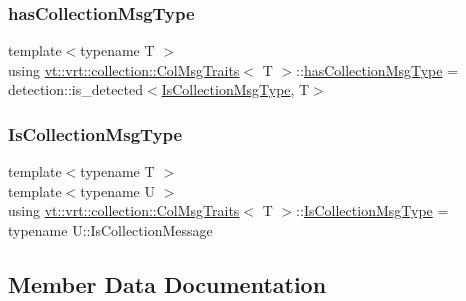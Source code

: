 \subsubsection{\texorpdfstring{has\+Collection\+Msg\+Type}{hasCollectionMsgType}}
{\footnotesize\ttfamily template$<$typename T $>$ \\
using \hyperlink{structvt_1_1vrt_1_1collection_1_1_col_msg_traits}{vt\+::vrt\+::collection\+::\+Col\+Msg\+Traits}$<$ T $>$\+::\hyperlink{structvt_1_1vrt_1_1collection_1_1_col_msg_traits_aa181d98e798e8846ceb8f1c8b8204a7e}{has\+Collection\+Msg\+Type} =  detection\+::is\+\_\+detected$<$\hyperlink{structvt_1_1vrt_1_1collection_1_1_col_msg_traits_ace04bfcf053b51736d5aec0d28b5274b}{Is\+Collection\+Msg\+Type}, T$>$}

\mbox{\label{structvt_1_1vrt_1_1collection_1_1_col_msg_traits_ace04bfcf053b51736d5aec0d28b5274b}} 
\subsubsection{\texorpdfstring{Is\+Collection\+Msg\+Type}{IsCollectionMsgType}}
{\footnotesize\ttfamily template$<$typename T $>$ \\
template$<$typename U $>$ \\
using \hyperlink{structvt_1_1vrt_1_1collection_1_1_col_msg_traits}{vt\+::vrt\+::collection\+::\+Col\+Msg\+Traits}$<$ T $>$\+::\hyperlink{structvt_1_1vrt_1_1collection_1_1_col_msg_traits_ace04bfcf053b51736d5aec0d28b5274b}{Is\+Collection\+Msg\+Type} =  typename U\+::\+Is\+Collection\+Message}



\subsection{Member Data Documentation}
\mbox{\label{structvt_1_1vrt_1_1collection_1_1_col_msg_traits_a8eb18b4bd6ca875aa981c1998a69896d}} 
